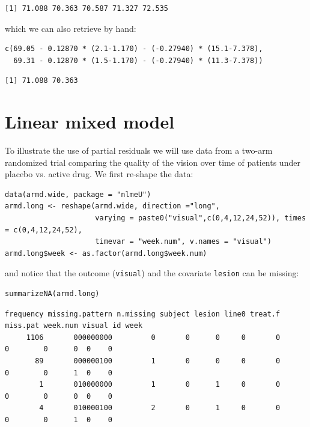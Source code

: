 \documentclass[12pt]{article}
\begin{document}
\begin{verbatim}
[1] 71.088 70.363 70.587 71.327 72.535
\end{verbatim}


which we can also retrieve by hand:
\lstset{language=r,label= ,caption= ,captionpos=b,numbers=none}
\begin{lstlisting}
c(69.05 - 0.12870 * (2.1-1.170) - (-0.27940) * (15.1-7.378),
  69.31 - 0.12870 * (1.5-1.170) - (-0.27940) * (11.3-7.378))
\end{lstlisting}

\begin{verbatim}
[1] 71.088 70.363
\end{verbatim}



\clearpage

\section{Linear mixed model}
\label{sec:orgb4095f6}

To illustrate the use of partial residuals we will use data from a
two-arm randomized trial comparing the quality of the vision over time
of patients under placebo vs. active drug. We first re-shape the data:
\lstset{language=r,label= ,caption= ,captionpos=b,numbers=none}
\begin{lstlisting}
data(armd.wide, package = "nlmeU")
armd.long <- reshape(armd.wide, direction ="long",
                     varying = paste0("visual",c(0,4,12,24,52)), times = c(0,4,12,24,52),
                     timevar = "week.num", v.names = "visual")
armd.long$week <- as.factor(armd.long$week.num)
\end{lstlisting}

and notice that the outcome (\texttt{visual}) and the covariate \texttt{lesion} can be missing:
\lstset{language=r,label= ,caption= ,captionpos=b,numbers=none}
\begin{lstlisting}
summarizeNA(armd.long)
\end{lstlisting}

\begin{verbatim}
frequency missing.pattern n.missing subject lesion line0 treat.f miss.pat week.num visual id week
     1106       000000000         0       0      0     0       0        0        0      0  0    0
       89       000000100         1       0      0     0       0        0        0      1  0    0
        1       010000000         1       0      1     0       0        0        0      0  0    0
        4       010000100         2       0      1     0       0        0        0      1  0    0
\end{verbatim}
\end{document}
